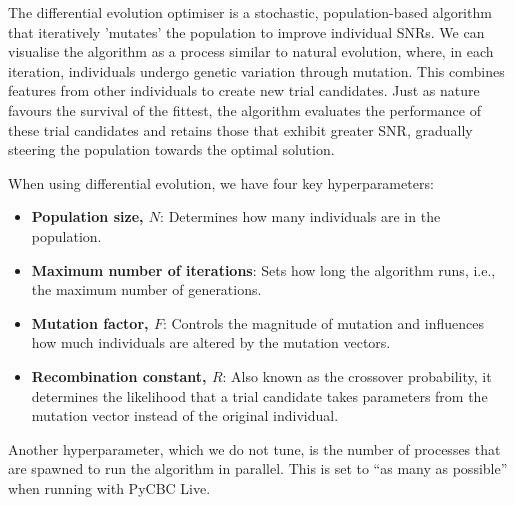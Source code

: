 The differential evolution optimiser is a stochastic, population-based algorithm that iteratively 'mutates' the population to improve individual SNRs. We can visualise the algorithm as a process similar to natural evolution, where, in each iteration, individuals undergo genetic variation through mutation. This combines features from other individuals to create new trial candidates. Just as nature favours the survival of the fittest, the algorithm evaluates the performance of these trial candidates and retains those that exhibit greater SNR, gradually steering the population towards the optimal solution.

When using differential evolution, we have four key hyperparameters:
%
\begin{itemize}
    \item \textbf{Population size, \( N \)}: Determines how many individuals are in the population.
    \item \textbf{Maximum number of iterations}: Sets how long the algorithm runs, i.e., the maximum number of generations.
    \item \textbf{Mutation factor, \( F \)}: Controls the magnitude of mutation and influences how much individuals are altered by the mutation vectors.
    \item \textbf{Recombination constant, \( R \)}: Also known as the crossover probability, it determines the likelihood that a trial candidate takes parameters from the mutation vector instead of the original individual.
\end{itemize}
%
Another hyperparameter, which we do not tune, is the number of processes that are spawned to run the algorithm in parallel. This is set to ``as many as possible'' when running with PyCBC Live.

